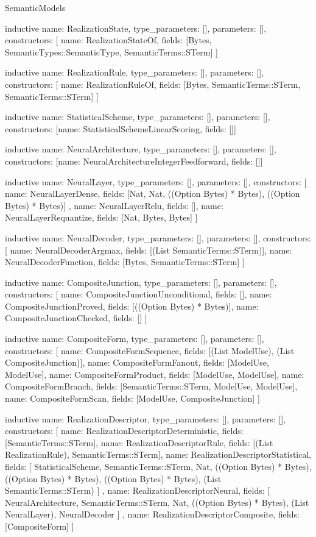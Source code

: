 \begin{lexlean}{SemanticModels}
\begin{semanticmodule}
inductive{
  name: RealizationState,
  type_parameters: [],
  parameters: [],
  constructors: [
    {name: RealizationStateOf, fields: [Bytes, SemanticTypes::SemanticType, SemanticTerms::STerm]}
  ]
}

inductive{
  name: RealizationRule,
  type_parameters: [],
  parameters: [],
  constructors: [
    {name: RealizationRuleOf, fields: [Bytes, SemanticTerms::STerm, SemanticTerms::STerm]}
  ]
}

inductive{
  name: StatisticalScheme,
  type_parameters: [],
  parameters: [],
  constructors: [{name: StatisticalSchemeLinearScoring, fields: []}]
}

inductive{
  name: NeuralArchitecture,
  type_parameters: [],
  parameters: [],
  constructors: [{name: NeuralArchitectureIntegerFeedforward, fields: []}]
}

inductive{
  name: NeuralLayer,
  type_parameters: [],
  parameters: [],
  constructors: [
    {
      name: NeuralLayerDense,
      fields: [Nat, Nat, ((Option Bytes) * Bytes), ((Option Bytes) * Bytes)]
    },
    {name: NeuralLayerRelu, fields: []},
    {name: NeuralLayerRequantize, fields: [Nat, Bytes, Bytes]}
  ]
}

inductive{
  name: NeuralDecoder,
  type_parameters: [],
  parameters: [],
  constructors: [
    {name: NeuralDecoderArgmax, fields: [(List SemanticTerms::STerm)]},
    {name: NeuralDecoderFunction, fields: [Bytes, SemanticTerms::STerm]}
  ]
}

inductive{
  name: CompositeJunction,
  type_parameters: [],
  parameters: [],
  constructors: [
    {name: CompositeJunctionUnconditional, fields: []},
    {name: CompositeJunctionProved, fields: [((Option Bytes) * Bytes)]},
    {name: CompositeJunctionChecked, fields: []}
  ]
}

inductive{
  name: CompositeForm,
  type_parameters: [],
  parameters: [],
  constructors: [
    {name: CompositeFormSequence, fields: [(List ModelUse), (List CompositeJunction)]},
    {name: CompositeFormFanout, fields: [ModelUse, ModelUse]},
    {name: CompositeFormProduct, fields: [ModelUse, ModelUse]},
    {name: CompositeFormBranch, fields: [SemanticTerms::STerm, ModelUse, ModelUse]},
    {name: CompositeFormScan, fields: [ModelUse, CompositeJunction]}
  ]
}

inductive{
  name: RealizationDescriptor,
  type_parameters: [],
  parameters: [],
  constructors: [
    {name: RealizationDescriptorDeterministic, fields: [SemanticTerms::STerm]},
    {name: RealizationDescriptorRule, fields: [(List RealizationRule), SemanticTerms::STerm]},
    {
      name: RealizationDescriptorStatistical,
      fields: [
        StatisticalScheme,
        SemanticTerms::STerm,
        Nat,
        ((Option Bytes) * Bytes),
        ((Option Bytes) * Bytes),
        ((Option Bytes) * Bytes),
        (List SemanticTerms::STerm)
      ]
    },
    {
      name: RealizationDescriptorNeural,
      fields: [
        NeuralArchitecture,
        SemanticTerms::STerm,
        Nat,
        ((Option Bytes) * Bytes),
        (List NeuralLayer),
        NeuralDecoder
      ]
    },
    {name: RealizationDescriptorComposite, fields: [CompositeForm]}
  ]
}


\end{semanticmodule}
\end{lexlean}
